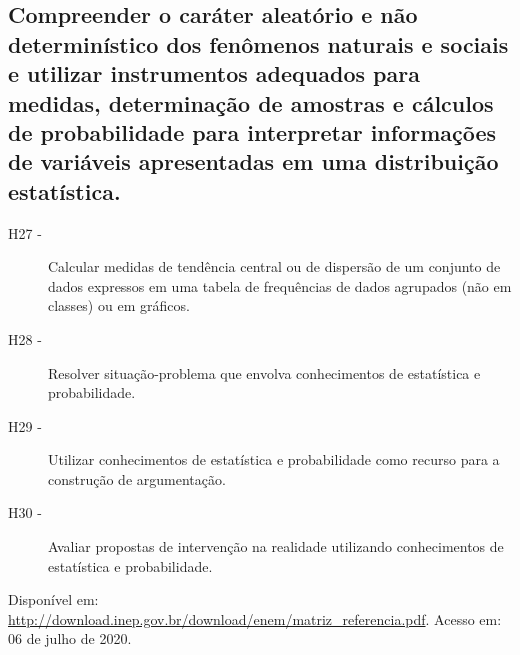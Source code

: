     \subsection*{Compreender o caráter aleatório e não determinístico dos fenômenos naturais e sociais e
    	utilizar instrumentos adequados para medidas, determinação de amostras e cálculos de probabilidade para
    	interpretar informações de variáveis apresentadas em uma distribuição estatística.}
    	\begin{description}
    		\item [H27 -]Calcular medidas de tendência central ou de dispersão de um conjunto de dados expressos em uma tabela de frequências de dados agrupados
    		(não em classes) ou em gráficos.
    		\item [H28 -]Resolver situação-problema que envolva conhecimentos de estatística e probabilidade.
    		\item [H29 -]Utilizar conhecimentos de estatística e probabilidade como recurso para a construção de argumentação.
    		\item [H30 -]Avaliar propostas de intervenção na realidade utilizando conhecimentos de estatística e probabilidade.
    	\end{description}

\vfill
\noindent Disponível em: \url{http://download.inep.gov.br/download/enem/matriz_referencia.pdf}. Acesso em: 06 de julho de 2020.